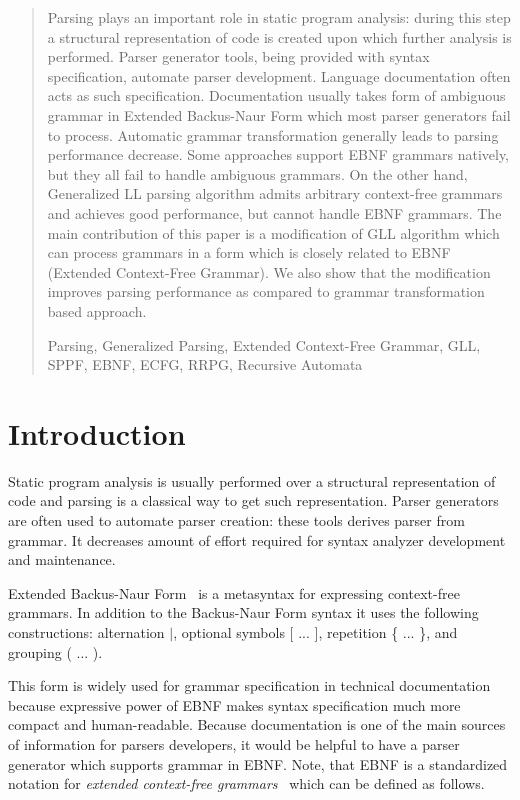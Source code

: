 \documentclass[runningheads,a4paper]{llncs}
\newcommand{\keywords}[1]{\par\addvspace\baselineskip
\noindent\keywordname\enspace\ignorespaces#1}
\begin{document}
\begin{abstract}
Parsing plays an important role in static program analysis: during this step a structural representation of code is created upon which further analysis is performed. 
Parser generator tools, being provided with syntax specification, automate parser development. 
Language documentation often acts as such specification. 
Documentation usually takes form of ambiguous grammar in Extended Backus-Naur Form which most parser generators fail to process. 
Automatic grammar transformation generally leads to parsing performance decrease. 
Some approaches support EBNF grammars natively, but they all fail to handle ambiguous grammars. 
On the other hand, Generalized LL parsing algorithm admits arbitrary context-free grammars and achieves good performance, but cannot handle EBNF grammars. 
The main contribution of this paper is a modification of GLL algorithm which can process grammars in a form which is closely related to EBNF (Extended Context-Free Grammar). 
We also show that the modification improves parsing performance as compared to grammar transformation based approach. 

\keywords{Parsing, Generalized Parsing, Extended Context-Free Grammar, GLL, SPPF, EBNF, ECFG, RRPG, Recursive Automata}
\end{abstract}


\section{Introduction}%

Static program analysis is usually performed over a structural representation of code and parsing is a classical way to get such representation.
Parser generators are often used to automate parser creation: these tools derives parser from grammar.
It decreases amount of effort required for syntax analyzer development and maintenance.

Extended Backus-Naur Form~\cite{EBNFISO} is a metasyntax for expressing context-free grammars. 
In addition to the Backus-Naur Form syntax it uses the following constructions: alternation $\mid$, optional symbols [ ... ], repetition \{ ... \}, and grouping ( ... ).

This form is widely used for grammar specification in technical documentation because expressive power of EBNF makes syntax specification much more compact and human-readable. 
Because documentation is one of the main sources of information for parsers developers, it would be helpful to have a parser generator which supports grammar in EBNF.
Note, that EBNF is a standardized notation for \textit{extended context-free grammars}~\cite{ECFG} which can be defined as follows.
\end{document}
